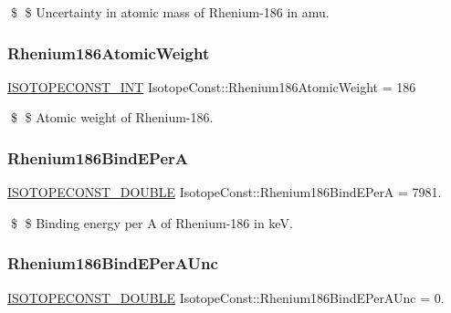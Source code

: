 \$ \$ Uncertainty in atomic mass of Rhenium-\/186 in amu. \mbox{\label{group___isotope_const-_rhenium-_re186_ga85306f0298e2593f535ec868c75dafc5}} 
\subsubsection{\texorpdfstring{Rhenium186\+Atomic\+Weight}{Rhenium186AtomicWeight}}
{\footnotesize\ttfamily \mbox{\hyperlink{group___isotope_const-_macros_ga5f18360b3e99483a35c32d789e62621c}{I\+S\+O\+T\+O\+P\+E\+C\+O\+N\+S\+T\+\_\+\+I\+NT}} Isotope\+Const\+::\+Rhenium186\+Atomic\+Weight = 186}

\$ \$ Atomic weight of Rhenium-\/186. \mbox{\label{group___isotope_const-_rhenium-_re186_ga3e74f50ddbcc54ad31c89fe4e6d6fff7}} 
\subsubsection{\texorpdfstring{Rhenium186\+Bind\+E\+PerA}{Rhenium186BindEPerA}}
{\footnotesize\ttfamily \mbox{\hyperlink{group___isotope_const-_macros_ga8f45a7272ce02c0b4c65c44636ed719a}{I\+S\+O\+T\+O\+P\+E\+C\+O\+N\+S\+T\+\_\+\+D\+O\+U\+B\+LE}} Isotope\+Const\+::\+Rhenium186\+Bind\+E\+PerA = 7981.}

\$ \$ Binding energy per A of Rhenium-\/186 in keV. \mbox{\label{group___isotope_const-_rhenium-_re186_gad6b82ea2e9b4ede26ddc15c23066050c}} 
\subsubsection{\texorpdfstring{Rhenium186\+Bind\+E\+Per\+A\+Unc}{Rhenium186BindEPerAUnc}}
{\footnotesize\ttfamily \mbox{\hyperlink{group___isotope_const-_macros_ga8f45a7272ce02c0b4c65c44636ed719a}{I\+S\+O\+T\+O\+P\+E\+C\+O\+N\+S\+T\+\_\+\+D\+O\+U\+B\+LE}} Isotope\+Const\+::\+Rhenium186\+Bind\+E\+Per\+A\+Unc = 0.}

